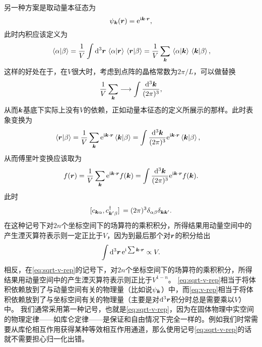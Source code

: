 \begin{enumerate}
    另一种方案是取动量本征态为
    \begin{equation}
        \psi_{\vb*{k}}(\vb*{r}) = \mathrm{e}^{\mathrm{i} \vb*{k} \cdot \vb*{r}},
    \end{equation}
    此时内积应该定义为
    \begin{equation}
        \braket*{\alpha}{\beta} = \frac{1}{V} \int \dd[3]{\vb*{r}} \braket*{\alpha}{\vb*{r}} \braket*{\vb*{r}}{\beta} = \frac{1}{V} \sum_{\vb*{k}} \braket*{\alpha}{\vb*{k}} \braket*{\vb*{k}}{\beta}, 
        \label{eq:integrate-ouver-whole-space-divided}
    \end{equation}
    这样的好处在于，在$V$很大时，考虑到点阵的晶格常数为$2\pi / L$，可以做替换
    \begin{equation}
        \frac{1}{V} \sum_{\vb*{k}} \longrightarrow \int \frac{\dd[3]{\vb*{k}}}{(2\pi)^3},
    \end{equation}
    从而$\vb*{k}$基底下实际上没有$V$的依赖，正如动量本征态的定义所展示的那样。此时表象变换为
    \[
        \braket*{\vb*{r}}{\beta} = \frac{1}{V} \sum_{\vb*{k}} \mathrm{e}^{\mathrm{i} \vb*{k} \cdot \vb*{r}} \braket*{\vb*{k}}{\beta} = \int \frac{\dd[3]{\vb*{k}}}{(2\pi)^3} \mathrm{e}^{\mathrm{i} \vb*{k} \cdot \vb*{r}} \braket*{\vb*{k}}{\beta}, \quad 
    \]
    从而傅里叶变换应该取为
    \begin{equation}
        f(\vb*{r}) = \frac{1}{V} \sum_{\vb*{k}} \mathrm{e}^{\mathrm{i} \vb*{k} \cdot \vb*{r}} f(\vb*{k}) = \int \frac{\dd[3]{\vb*{k}}}{(2\pi)^3} \mathrm{e}^{\mathrm{i} \vb*{k} \cdot \vb*{r}} f(\vb*{k}).
        \label{eq:v-rep}
    \end{equation}
    此时
    \begin{equation}
        \comm*{c_{\vb*{k} \alpha}}{c_{\vb*{k}' \beta}^\dagger} = (2\pi)^3 \delta_{\alpha \beta} \delta_{\vb*{k} \vb*{k}'}.
    \end{equation}
    在这种记号下对$2n$个坐标空间下的场算符的乘积积分，所得结果用动量空间中的产生湮灭算符表示则一定正比于$V$，因为到最后那个对$\vb*{r}$的积分给出
    \[
        \int \dd[3]{\vb*{r}} \mathrm{e}^{\mathrm{i} \sum \vb*{k} \cdot \vb*{r}} \propto V.
    \]
    相反，在\eqref{eq:sqrt-v-rep}的记号下，对$2n$个坐标空间下的场算符的乘积积分，所得结果用动量空间中的产生湮灭算符表示则正比于$V^{1 - n}$。
    \eqref{eq:sqrt-v-rep}相当于将体积依赖放到了与动量空间有关的物理量（比如说$\psi_{\vb*{k}}$）中，而\eqref{eq:v-rep}相当于将体积依赖放到了与坐标空间有关的物理量（主要是对$\dd[3]{\vb*{r}}$积分时总是需要乘以$V$）中。
    我们通常采用第一种记号，也就是\eqref{eq:sqrt-v-rep}，因为在固体物理中实空间的物理定律——如库仑定律——是保证和自由情况下完全一样的。例如我们时常需要从库伦相互作用获得某种等效相互作用通道，那么使用记号\eqref{eq:sqrt-v-rep}的话就不需要担心归一化出错。


\end{enumerate}
